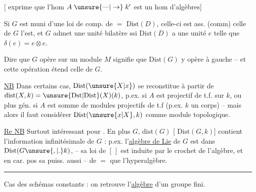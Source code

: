 [ exprime que l'hom $A\mathrel{\unsure{\text{---}|\to}}k'$ est un hom d'algèbres]

Si $G$ est muni d'une loi de comp. de $=$ $\mathrm{Dist}(D)$, celle-ci est ass. (comm)  celle de $G$ l'est, et  $G$ admet une unité bilatère ssi $\mathrm{Dist}(D)$ a une unité  $e$ telle que $\delta(e)=e\otimes e$.

Dire que $G$ opère sur un module $M$  signifie que $\mathrm{Dist}(G)$ y opère à gauche -- et cette opération étend celle de $G$.

\uline{NB} Dans certains cas, $\mathrm{Dist}(\unsure{X|x})$ se reconstitue à partir de $\mathrm{dist}(X,k)=\unsure{\mathrm{Dst}|\mathrm{Dist}}(X)(k)$, p.ex. si $A$ est  projectif de t.f. sur $k$, ou plus gén. si $A$ est somme de modules projectifs de t.f (p.ex.  $k$ un corps) -- mais alors il faut considérer $\mathrm{Dist}(\unsure{x|X},k)$ comme module topologique.

\uline{Re NB} Surtout intéressant pour . En plus   $G$, $\mathrm{dist}(G)$  [ $\mathrm{Dist}(G,k)$] contient  l'information infinitésimale de $G$ : p.ex. l'\uline{algèbre de Lie} de $G$ est  dans $\mathrm{Dist}(G\unsure{,|.}k)$, --  sa loi de $[\,]$ est induite par le crochet de l'algèbre, et en car. pos sa puiss.  aussi -- de $=$ que l'hyperalgèbre.

\begin{center}\rule{1.6cm}{0.55pt}\end{center}
Cas des schémas constants : on retrouve l'\uline{algèbre} d'un groupe fini.

